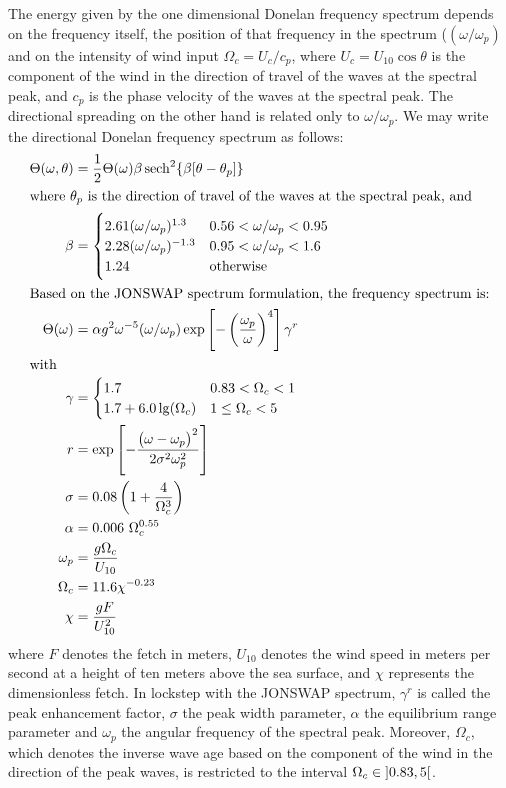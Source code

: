 The energy given by the one dimensional Donelan frequency spectrum depends on 
the frequency itself, the position of that frequency in the spectrum 
($(\omega/\omega_p)$ and on the intensity of wind input $\Omega_c = U_c/c_p$, 
where $U_c = U_{10}\cos{\theta}$ is the component of the wind in the direction 
of travel of the waves at the spectral peak, and $c_p$ is the phase velocity of 
the waves at the spectral peak. The directional spreading on the other hand is 
related only to $\omega/\omega_p$. We may write the directional Donelan 
frequency spectrum as follows:
\begin{subequations}
\begin{align}
 \Theta(\omega, \theta) &= \frac{1}{2}\Theta(\omega)\beta\operatorname{sech}^2
\{\beta[\theta - \theta_p]\}\\
\intertext{where $\theta_p$ is the direction of travel of the waves at the 
spectral peak, and}
\beta &= \begin{cases}
	2.61(\omega/\omega_p)^{1.3} & 0.56 < \omega/\omega_p < 0.95\\
	2.28(\omega/\omega_p)^{-1.3} & 0.95 < \omega/\omega_p < 1.6\\
	1.24 & \text{otherwise}
    \end{cases} \\
\intertext{Based on the JONSWAP spectrum formulation, the frequency spectrum 
is:}
 \Theta(\omega) &= 
\alpha g^2 \omega^{-5}(\omega/\omega_p) \exp\left[-\left(\frac{\omega_p}{\omega}
\right)^4\right]\gamma^r\\
\intertext{with}
\gamma &= \begin{cases}
	1.7 & 0.83 < \Omega_c < 1\\
	1.7 + 6.0\lg(\Omega_c) & 1\leq\Omega_c < 5
	\end{cases}\\
r &= \exp\left[-\frac{\left(\omega -
\omega_p\right)^2}{2\sigma^2\omega_p^2}\right] \\
\sigma &= 0.08\left(1 + \frac{4}{\Omega_c^3}\right)\\
\alpha &= 0.006~\Omega_c^{0.55} \\
\omega_{p} &= \frac{g\Omega_c}{U_{10}}\\
\Omega_c &= 11.6\chi^{-0.23} \\
\chi &= \frac{gF}{U_{10}^{2}}
\end{align}
\end{subequations}
where $F$ denotes the fetch in meters, $U_{10}$ denotes the wind speed in 
meters per second at a height of ten meters above the sea surface, and $\chi$ 
represents the dimensionless fetch. In lockstep with the JONSWAP spectrum, 
$\gamma^r$ is called the peak enhancement factor, $\sigma$ the peak width 
parameter, $\alpha$ the equilibrium range parameter and $\omega_p$ the angular 
frequency of the spectral peak. Moreover, $\Omega_c$, which denotes the inverse 
wave age based on the component of the wind in the direction of the peak waves,
is restricted to the interval $\Omega_c \in \interval[open left, open 
right]{0.83}{5}$.\\

